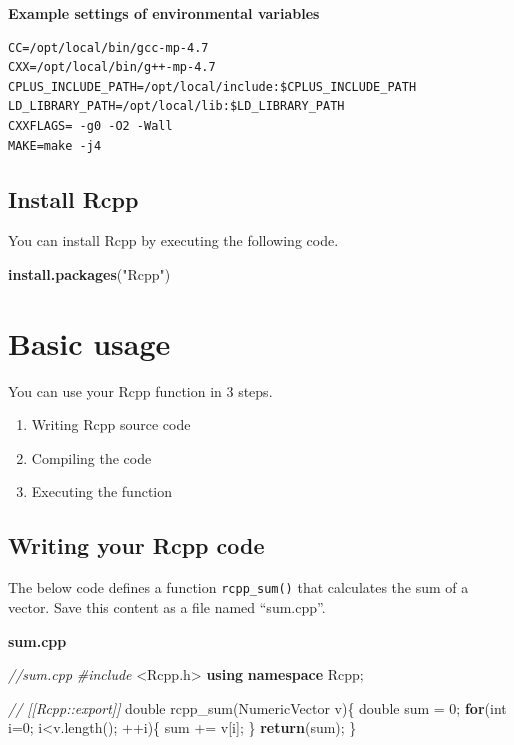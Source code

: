 \documentclass[]{book}
\newenvironment{Shaded}{\begin{snugshade}}{\end{snugshade}}
\newcommand{\CommentTok}[1]{\textcolor[rgb]{0.56,0.35,0.01}{\textit{#1}}}
\newcommand{\ControlFlowTok}[1]{\textcolor[rgb]{0.13,0.29,0.53}{\textbf{#1}}}
\newcommand{\DataTypeTok}[1]{\textcolor[rgb]{0.13,0.29,0.53}{#1}}
\newcommand{\DecValTok}[1]{\textcolor[rgb]{0.00,0.00,0.81}{#1}}
\newcommand{\ImportTok}[1]{#1}
\newcommand{\KeywordTok}[1]{\textcolor[rgb]{0.13,0.29,0.53}{\textbf{#1}}}
\newcommand{\NormalTok}[1]{#1}
\newcommand{\PreprocessorTok}[1]{\textcolor[rgb]{0.56,0.35,0.01}{\textit{#1}}}
\newcommand{\StringTok}[1]{\textcolor[rgb]{0.31,0.60,0.02}{#1}}
\providecommand{\tightlist}{%
  \setlength{\itemsep}{0pt}\setlength{\parskip}{0pt}}
\begin{document}
\textbf{Example settings of environmental variables}

\begin{verbatim}
CC=/opt/local/bin/gcc-mp-4.7
CXX=/opt/local/bin/g++-mp-4.7
CPLUS_INCLUDE_PATH=/opt/local/include:$CPLUS_INCLUDE_PATH
LD_LIBRARY_PATH=/opt/local/lib:$LD_LIBRARY_PATH
CXXFLAGS= -g0 -O2 -Wall
MAKE=make -j4
\end{verbatim}

\hypertarget{install-rcpp}{%
\section{Install Rcpp}\label{install-rcpp}}

You can install Rcpp by executing the following code.

\begin{Shaded}
\begin{Highlighting}[]
\KeywordTok{install.packages}\NormalTok{(}\StringTok{"Rcpp"}\NormalTok{)}
\end{Highlighting}
\end{Shaded}

\hypertarget{basic-usage}{%
\chapter{Basic usage}\label{basic-usage}}

You can use your Rcpp function in 3 steps.

\begin{enumerate}
\def\labelenumi{\arabic{enumi}.}
\tightlist
\item
  Writing Rcpp source code
\item
  Compiling the code
\item
  Executing the function
\end{enumerate}

\hypertarget{writing-your-rcpp-code}{%
\section{Writing your Rcpp code}\label{writing-your-rcpp-code}}

The below code defines a function \texttt{rcpp\_sum()} that calculates the sum of a vector. Save this content as a file named ``sum.cpp''.

\textbf{sum.cpp}

\begin{Shaded}
\begin{Highlighting}[]
\CommentTok{//sum.cpp}
\PreprocessorTok{#include }\ImportTok{<Rcpp.h>}
\KeywordTok{using} \KeywordTok{namespace}\NormalTok{ Rcpp;}

\CommentTok{// [[Rcpp::export]]}
\DataTypeTok{double}\NormalTok{ rcpp_sum(NumericVector v)\{}
    \DataTypeTok{double}\NormalTok{ sum = }\DecValTok{0}\NormalTok{;}
    \ControlFlowTok{for}\NormalTok{(}\DataTypeTok{int}\NormalTok{ i=}\DecValTok{0}\NormalTok{; i<v.length(); ++i)\{}
\NormalTok{        sum += v[i];}
\NormalTok{    \}}
    \ControlFlowTok{return}\NormalTok{(sum);}
\NormalTok{\}}
\end{Highlighting}
\end{Shaded}
\end{document}
